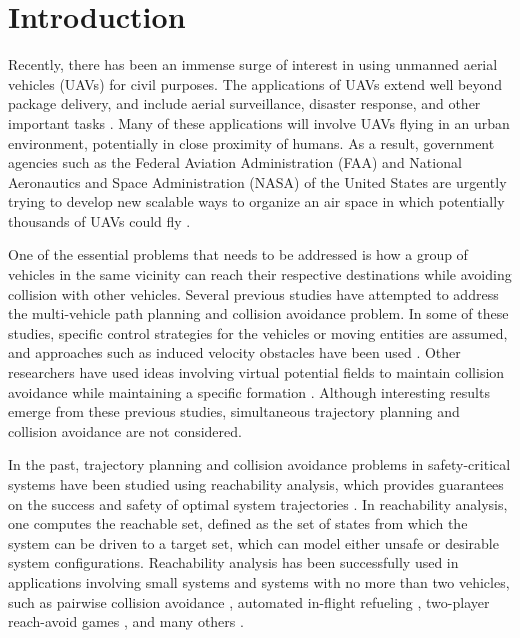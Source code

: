\section{Introduction}
Recently, there has been an immense surge of interest in using unmanned aerial vehicles (UAVs) for civil purposes. The applications of UAVs extend well beyond package delivery, and include aerial surveillance, disaster response, and other important tasks \cite{Tice91, Debusk10, Amazon16, AUVSI16, BBC16}. Many of these applications will involve UAVs flying in an urban environment, potentially in close proximity of humans. As a result, government agencies such as the Federal Aviation Administration (FAA) and National Aeronautics and Space Administration (NASA) of the United States are urgently trying to develop new scalable ways to organize an air space in which potentially thousands of UAVs could fly \cite{FAA13, NASA16}.

One of the essential problems that needs to be addressed is how a group of vehicles in the same vicinity can reach their respective destinations while avoiding collision with other vehicles. Several previous studies have attempted to address the multi-vehicle path planning and collision avoidance problem. In some of these studies, specific control strategies for the vehicles or moving entities are assumed, and approaches such as induced velocity obstacles have been used \cite{Fiorini98, Chasparis05, Vandenberg08}.  Other researchers have used ideas involving virtual potential fields to maintain collision avoidance while maintaining a specific formation \cite{Saber02, Chuang07}. Although interesting results emerge from these previous studies, simultaneous trajectory planning and collision avoidance are not considered. 

In the past, trajectory planning and collision avoidance problems in safety-critical systems have been studied using reachability analysis, which provides guarantees on the success and safety of optimal system trajectories \cite{Barron90, Mitchell05, Bokanowski10, Fisac15}. In reachability analysis, one computes the reachable set, defined as the set of states from which the system can be driven to a target set, which can model either unsafe or desirable system configurations. Reachability analysis has been successfully used in applications involving small systems and systems with no more than two vehicles, such as pairwise collision avoidance \cite{Mitchell05}, automated in-flight refueling \cite{Ding08}, two-player reach-avoid games \cite{Huang11}, and many others \cite{Bayen07, Chen15b, Chen15}.

